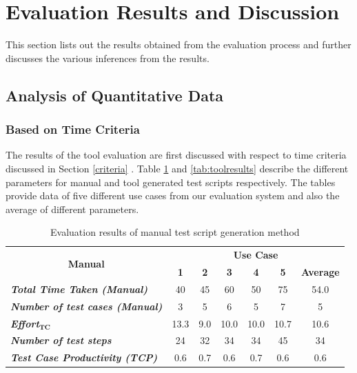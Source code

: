 \section{Evaluation Results and Discussion}
This section lists out the results obtained from the evaluation process and further discusses the various inferences from the results.
\subsection{Analysis of Quantitative Data}
\subsubsection{Based on Time Criteria}
The results of the tool evaluation are first discussed with respect to time criteria discussed in Section \ref{criteria} . Table \ref{tab:manualresults} and \ref{tab:toolresults} describe the different parameters for manual and tool generated test scripts respectively. The tables provide data of five different use cases from our evaluation system and also the average of different parameters.

\begin{table}[htbp]
  \centering
  \caption{Evaluation results of manual test script generation method}
  	\begin{adjustbox}{width=1\textwidth}
    \begin{tabular}{|l|c|c|c|c|c|c|}
    \toprule
    \multicolumn{1}{|c|}{\multirow{2}[4]{*}{\textbf{Manual}}} & \multicolumn{6}{c|}{\textbf{Use Case }} \\
\cmidrule{2-7}          & \textbf{1} & \textbf{2} & \textbf{3} & \textbf{4} & \textbf{5} & \textbf{Average} \\
    \midrule
    \textit{\textbf{Total Time Taken (Manual)}} & 40    & 45    & 60    & 50    & 75    & 54.0 \\
    \midrule
    \textit{\textbf{Number of test cases (Manual) }} & 3     & 5     & 6     & 5     & 7     & 5 \\
    \midrule
    \textit{\textbf{Effort$ _{\textbf{TC}}$}} & 13.3  & 9.0   & 10.0  & 10.0  & 10.7  & 10.6 \\
    \midrule
    \textit{\textbf{Number of test steps}} & 24    & 32    & 34    & 34    & 45    & 34 \\
    \midrule
    \textit{\textbf{Test Case Productivity (TCP)}} & 0.6   & 0.7   & 0.6   & 0.7   & 0.6   & 0.6 \\
    \bottomrule
    \end{tabular}%
    \end{adjustbox}
  \label{tab:manualresults}%
\end{table}%


